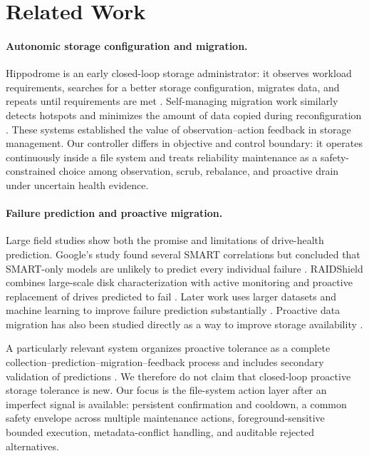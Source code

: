 \section{Related Work}
\label{sec:related-work}

\paragraph{Autonomic storage configuration and migration.}
Hippodrome is an early closed-loop storage administrator: it observes workload requirements, searches for a better storage configuration, migrates data, and repeats until requirements are met \citep{anderson2002hippodrome}. Self-managing migration work similarly detects hotspots and minimizes the amount of data copied during reconfiguration \citep{sundaram2006migration}. These systems established the value of observation--action feedback in storage management. Our controller differs in objective and control boundary: it operates continuously inside a file system and treats reliability maintenance as a safety-constrained choice among observation, scrub, rebalance, and proactive drain under uncertain health evidence.

\paragraph{Failure prediction and proactive migration.}
Large field studies show both the promise and limitations of drive-health prediction. Google's study found several SMART correlations but concluded that SMART-only models are unlikely to predict every individual failure \citep{pinheiro2007failure}. RAIDShield combines large-scale disk characterization with active monitoring and proactive replacement of drives predicted to fail \citep{ma2015raidshield}. Later work uses larger datasets and machine learning to improve failure prediction substantially \citep{lu2020smarter}. Proactive data migration has also been studied directly as a way to improve storage availability \citep{wu2015migration}.

A particularly relevant system organizes proactive tolerance as a complete collection--prediction--migration--feedback process and includes secondary validation of predictions \citep{yang2020proactive}. We therefore do not claim that closed-loop proactive storage tolerance is new. Our focus is the file-system action layer after an imperfect signal is available: persistent confirmation and cooldown, a common safety envelope across multiple maintenance actions, foreground-sensitive bounded execution, metadata-conflict handling, and auditable rejected alternatives.

